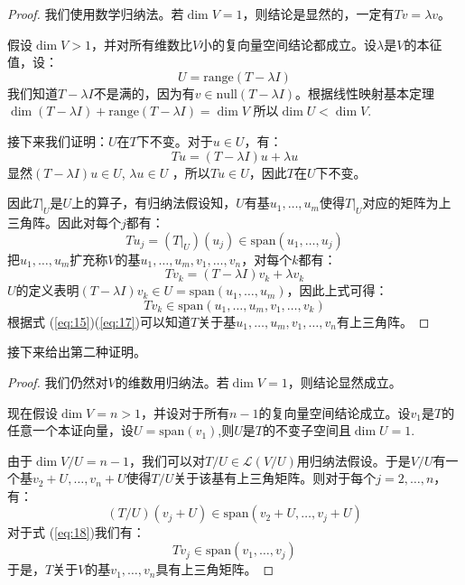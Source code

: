 \documentclass[10pt,a4paper,UTF8]{article}
\begin{document}
\begin{proof}
我们使用数学归纳法。若\(\dim V = 1\)，则结论是显然的，一定有\(Tv = \lambda v\)。

假设\(\dim V > 1\)，并对所有维数比\(V\)小的复向量空间结论都成立。设\(\lambda\)是\(V\)的本征值，设：
\begin{equation}
\label{eq:13}
U = \mathrm{range}(T-\lambda I)
\end{equation}
我们知道\(T -\lambda I\)不是满的，因为有\(v\in \mathrm{null} (T - \lambda I)\)。根据线性映射基本定理\(\dim (T-\lambda I) + \mathrm{range}(T-\lambda I) = \dim V\) 所以\(\dim U < \dim V\).

接下来我们证明：\(U\)在\(T\)下不变。对于\(u\in U\)，有：
\begin{equation}
\label{eq:14}
Tu = (T-\lambda I)u + \lambda u
\end{equation}
显然\((T-\lambda I)u \in U\), \(\lambda u \in U\) ，所以\(Tu \in U\)，因此\(T\)在\(U\)下不变。

因此\(T|_{U}\)是\(U\)上的算子，有归纳法假设知，\(U\)有基\(u_{1},\ldots ,u_{m}\)使得\(T|_{U}\)对应的矩阵为上三角阵。因此对每个\(j\)都有：
\begin{equation}
\label{eq:15}
Tu_{j} = (T|_{U})(u_{j}) \in \mathrm{span}(u_{1},\ldots ,u_{j})
\end{equation}
把\(u_{1},\ldots ,u_{m}\)扩充称\(V\)的基\(u_{1},\ldots ,u_{m},v_{1},\ldots ,v_{n}\)，对每个\(k\)都有：
\begin{equation}
\label{eq:16}
Tv_{k} = (T-\lambda I)v_{k} + \lambda v_{k}
\end{equation}
\(U\)的定义表明\((T- \lambda I)v_{k}\in U = \mathrm{span}(u_{1},\ldots ,u_{m})\)，因此上式可得：
\begin{equation}
\label{eq:17}
Tv_{k} \in \mathrm{span}(u_{1},\ldots ,u_{m},v_{1},\ldots ,v_{k})
\end{equation}
根据式 (\ref{eq:15})(\ref{eq:17})可以知道\(T\)关于基\(u_{1},\ldots ,u_{m},v_{1},\ldots ,v_{n}\)有上三角阵。
\end{proof}
接下来给出第二种证明。
\begin{proof}
我们仍然对\(V\)的维数用归纳法。若\(\dim V = 1\)，则结论显然成立。

现在假设\(\dim V = n > 1\)，并设对于所有\(n-1\)的复向量空间结论成立。设\(v_{1}\)是\(T\)的任意一个本证向量，设\(U= \mathrm{span}(v_{1})\),则\(U\)是\(T\)的不变子空间且\(\dim U = 1\).

由于\(\dim V/U = n-1\)，我们可以对\(T/U \in \mathcal{L}(V/U)\)用归纳法假设。于是\(V/U\)有一个基\(v_{2} + U,\ldots ,v_{n}+ U\)使得\(T/U\)关于该基有上三角矩阵。则对于每个\(j=2,\ldots ,n\)，有：
\begin{equation}
\label{eq:18}
(T/U)(v_{j} + U) \in \mathrm{span}(v_{2} + U, \ldots ,v_{j} + U)
\end{equation}
对于式 (\ref{eq:18})我们有：
\begin{equation}
\label{eq:19}
Tv_{j}\in \mathrm{span}(v_{1},\ldots ,v_{j})
\end{equation}
于是，\(T\)关于\(V\)的基\(v_{1},\ldots ,v_{n}\)具有上三角矩阵。
\end{proof}
\end{document}
